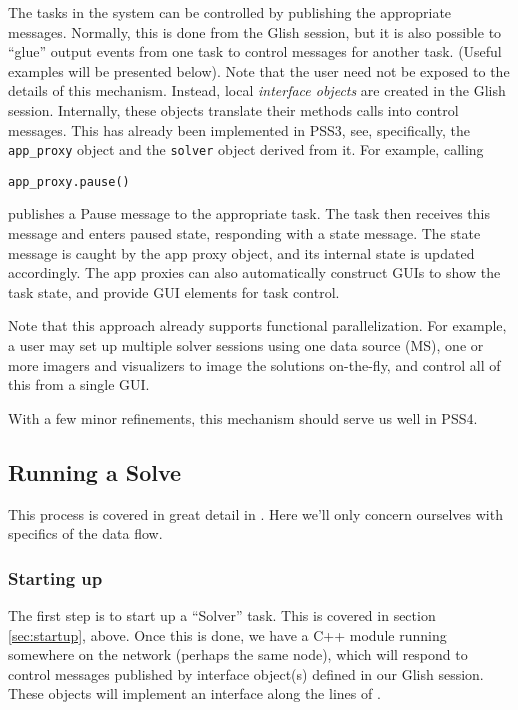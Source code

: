 \documentclass[12pt]{article}
\begin{document}
  The tasks in the system can be controlled by publishing the appropriate
  messages. Normally, this is done from the Glish session, but it is also
  possible to ``glue'' output events from one task to control messages  for
  another task. (Useful examples will be presented below). Note that the user
  need not be exposed to the details of this mechanism. Instead, local {\em
  interface objects} are created in the Glish session. Internally, these
  objects translate their methods calls into control messages. This has already
  been implemented in PSS3, see, specifically, the {\tt app\_proxy} object and
  the {\tt solver} object derived from it. For example, calling

\begin{verbatim}
app_proxy.pause()
\end{verbatim}

  publishes a Pause message to the appropriate task. The task then receives
  this message and enters paused state, responding with a state message. The
  state message is caught by the app proxy object, and its internal state is
  updated accordingly. The app proxies can also automatically construct GUIs to
  show the task state, and provide GUI elements for task control.

  Note that this approach already supports functional parallelization. For
  example, a user may set up multiple solver sessions using one data source
  (MS), one or more imagers and visualizers to image the solutions on-the-fly,
  and control all of this from a single GUI.

  With a few minor refinements, this mechanism should serve us well in PSS4. 

\subsection{Running a Solve}
  
  This process is covered in great detail in \cite{PSS4}. Here we'll only
  concern ourselves with specifics of the data flow. 

\subsubsection{Starting up}

  The first step is to start up a ``Solver'' task. This is covered in section
  \ref{sec:startup}, above. Once this is done, we have a C++ module running
  somewhere on the network (perhaps the same node), which will respond to
  control messages published by interface object(s) defined in our Glish
  session. These objects will implement an interface along the lines of
  \cite{PSS4}. 
\end{document}

